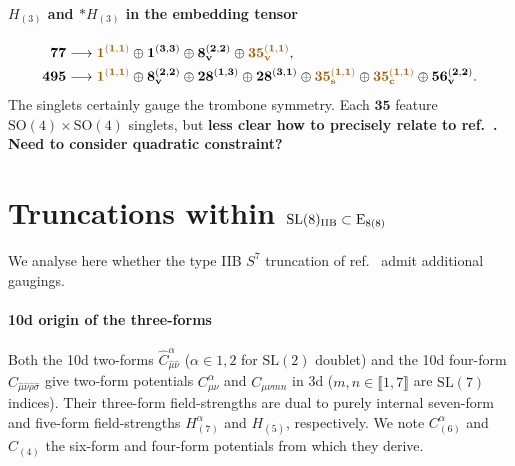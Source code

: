 \documentclass[11pt]{article}
\newcommand{\SO}{\ensuremath{\mathrm{SO}}\xspace}
\newcommand{\SL}{\ensuremath{\mathrm{SL}}\xspace}
\newcommand{\E}{\ensuremath{\mathrm{E}}\xspace}
\newcommand{\ce}[1]{\marginpar{\parbox{\marginparwidth}{\boldmath $\Longleftarrow$}}
{\boldmath\bfseries #1}}
\begin{document}
  \paragraph{\boldmath $H_{(3)}$ and $*H_{(3)}$ in the embedding tensor}
  \begin{equation}
    \begin{aligned}
      \bm{77} &\longrightarrow {\color{mydarkorange}\bm{1}^{(\bm{1},\bm{1})}} \oplus \bm{1}^{(\bm{3},\bm{3})} \oplus \bm{8_{\rm v}}^{(\bm{2},\bm{2})} \oplus {\color{mydarkorange}\bm{35_{\rm v}}^{(\bm{1},\bm{1})}},\\
      \bm{495} &\longrightarrow {\color{mydarkorange}\bm{1}^{(\bm{1},\bm{1})}} \oplus \bm{8_{\rm v}}^{(\bm{2},\bm{2})} \oplus \bm{28}^{(\bm{1},\bm{3})} \oplus \bm{28}^{(\bm{3},\bm{1})} \oplus {\color{mydarkorange}\bm{35_{\rm s}}^{(\bm{1},\bm{1})}} \oplus {\color{mydarkorange}\bm{35_{\rm c}}^{(\bm{1},\bm{1})}} \oplus \bm{56_{\rm v}}^{(\bm{2},\bm{2})}.
    \end{aligned}
  \end{equation}
  The singlets certainly gauge the trombone symmetry. Each $\bm{35}$ feature $\SO(4)\times\SO(4)$ singlets, but \ce{less clear how to precisely relate to ref.~\cite{Eloy:2021fhc}. Need to consider quadratic constraint?}

  


\section{Truncations within \texorpdfstring{$\SL(8)_{\rm IIB}\subset\E_{8(8)}$}{SL(8)IIB in E8(8)}}
We analyse here whether the type IIB $S^{7}$ truncation of ref.~\cite{Galli:2022idq} admit additional gaugings.

\paragraph{10d origin of the three-forms} Both the 10d two-forms $\hat{C}_{\hat\mu\hat\nu}^{\alpha}$ ($\alpha\in{1,2}$ for $\SL(2)$ doublet) and the 10d four-form $\hat{C}_{\hat\mu\hat\nu\hat\rho\hat\sigma}$ give two-form potentials $C^{\alpha}_{\mu\nu}$ and $C_{\mu\nu mn}$ in 3d ($m,n\in\llbracket1,7\rrbracket$ are $\SL(7)$ indices). Their three-form field-strengths are dual to purely internal seven-form and five-form field-strengths $H_{(7)}^{\alpha}$ and $H_{(5)}$, respectively. We note $C_{(6)}^{\alpha}$ and $C_{(4)}$ the six-form and four-form potentials from which they derive.
\end{document}
